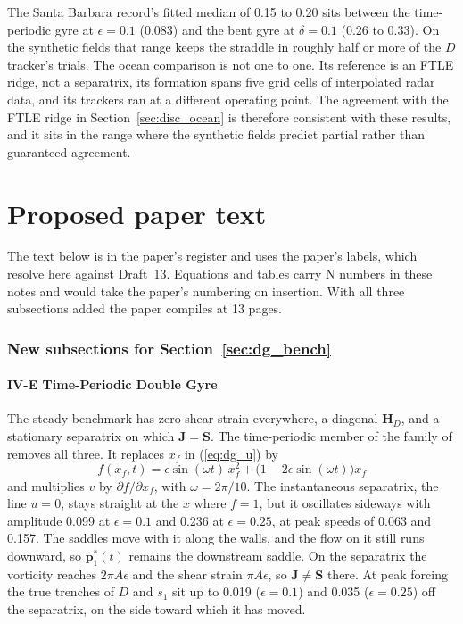 \documentclass[11pt]{article}
\newcommand{\Dtr}{$D$ tracker}
\begin{document}
The Santa Barbara record's fitted median of 0.15 to 0.20 sits between the
time-periodic gyre at $\epsilon = 0.1$ (0.083) and the bent gyre at
$\delta = 0.1$ (0.26 to 0.33). On the synthetic fields that range keeps
the straddle in roughly half or more of the \Dtr{}'s trials. The ocean
comparison is not one to one. Its reference is an FTLE ridge, not a
separatrix, its formation spans five grid cells of interpolated radar
data, and its trackers ran at a different operating point. The
agreement with the FTLE ridge in Section~\ref{sec:disc_ocean} is
therefore consistent with these results, and it sits in the range where
the synthetic fields predict partial rather than guaranteed agreement.

\part{Proposed paper text}

\noindent The text below is in the paper's register and uses the paper's
labels, which resolve here against Draft~13. Equations and tables carry
N numbers in these notes and would take the paper's numbering on
insertion. With all three subsections added the paper compiles at 13
pages.

\section{New subsections for Section~\ref{sec:dg_bench}}

\subsection*{IV-E \quad Time-Periodic Double Gyre}

The steady benchmark has zero shear strain everywhere, a diagonal
$\mathbf{H}_D$, and a stationary separatrix on which
$\mathbf{J} = \mathbf{S}$. The time-periodic member of the family of
\cite{17} removes all three. It replaces $x_f$ in (\ref{eq:dg_u}) by
\begin{equation}
    f(x_f, t) = \epsilon \sin(\omega t)\, x_f^2
        + \bigl(1 - 2\epsilon \sin(\omega t)\bigr) x_f
    \label{eq:dg_f}
\end{equation}
and multiplies $v$ by $\partial f/\partial x_f$, with $\omega = 2\pi/10$.
The instantaneous separatrix, the line $u = 0$, stays straight at the $x$
where $f = 1$, but it oscillates sideways with amplitude 0.099 at
$\epsilon = 0.1$ and 0.236 at $\epsilon = 0.25$, at peak speeds of 0.063
and 0.157. The saddles move with it along the walls, and the flow on it
still runs downward, so $\mathbf{p}^*_1(t)$ remains the downstream saddle.
On the separatrix the vorticity reaches $2\pi A\epsilon$ and the shear
strain $\pi A\epsilon$, so $\mathbf{J} \neq \mathbf{S}$ there. At peak
forcing the true trenches of $D$ and $s_1$ sit up to 0.019
($\epsilon = 0.1$) and 0.035 ($\epsilon = 0.25$) off the separatrix, on
the side toward which it has moved.
\end{document}
